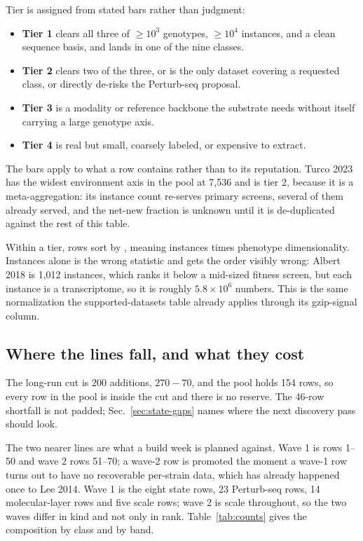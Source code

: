 Tier is assigned from stated bars rather than judgment:

\begin{itemize}[leftmargin=1.2em,itemsep=1pt,topsep=2pt]
  \item \textbf{Tier 1} clears all three of $\geq$$10^3$ genotypes, $\geq$$10^4$ instances,
    and a clean sequence basis, and lands in one of the nine classes.
  \item \textbf{Tier 2} clears two of the three, or is the only dataset covering a
    requested class, or directly de-risks the Perturb-seq proposal.
  \item \textbf{Tier 3} is a modality or reference backbone the substrate needs without
    itself carrying a large genotype axis.
  \item \textbf{Tier 4} is real but small, coarsely labeled, or expensive to extract.
\end{itemize}

The bars apply to what a row contains rather than to its reputation. Turco 2023 has the
widest environment axis in the pool at 7,536 and is tier 2, because it is a
meta-aggregation: its instance count re-serves primary screens, several of them already
served, and the net-new fraction is unknown until it is de-duplicated against the rest of
this table.

Within a tier, rows sort by , meaning instances times phenotype
dimensionality. Instances alone is the wrong statistic and gets the order visibly wrong:
Albert 2018 is 1,012 instances, which ranks it below a mid-sized fitness screen, but each
instance is a transcriptome, so it is roughly $5.8\times10^6$ numbers. This is the same
normalization the supported-datasets table already applies through its gzip-signal column.

\subsection{Where the lines fall, and what they cost}

The long-run cut is 200 additions, $270-70$, and the pool holds 154 rows, so every row in
the pool is inside the cut and there is no reserve. The 46-row shortfall is not padded;
Sec.~\ref{sec:state-gaps} names where the next discovery pass should look.

The two nearer lines are what a build week is planned against. Wave 1 is rows 1--50 and
wave 2 rows 51--70; a wave-2 row is promoted the moment a wave-1 row turns out to have no
recoverable per-strain data, which has already happened once to Lee 2014. Wave 1 is the
eight state rows, 23 Perturb-seq rows, 14 molecular-layer rows and five scale rows; wave 2
is scale throughout, so the two waves differ in kind and not only in rank.
Table~\ref{tab:counts} gives the composition by class and by band.

